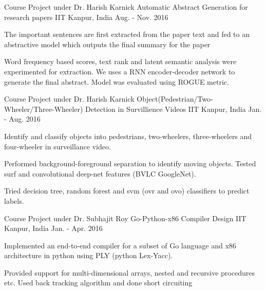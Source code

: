 \begin{cventries}
	\cventry
	{Course Project under Dr. Harish Karnick} %
	{Automatic Abstract Generation for research papers} %
	{IIT Kanpur, India} %
	{Aug. - Nov. 2016} %
	{
		\begin{cvitems} %
			\item The important sentences are first extracted from the paper text and fed to an abstractive model which outputs the final summary for the paper
			\item Word frequency based scores, text rank and latent semantic analysis were experimented for extraction. We uses a RNN encoder-decoder network to generate the final abstract. Model was evaluated using ROGUE metric.  
		\end{cvitems}
	}
	\cventry
	{Course Project under Dr. Harish Karnick} %
	{Object(Pedestrian/Two-Wheeler/Three-Wheeler) Detection in Survillience Videos} %
	{IIT Kanpur, India} %
	{Jan. - Aug. 2016} %
	{
		\begin{cvitems} %
			\item {Identify and classify objects into pedestrians, two-wheelers, three-wheelers and four-wheeler in surveillance video.}
			\item {Performed background-foreground separation to identify moving objects. Tested surf and convolutional deep-net features (BVLC GoogleNet).}
			\item {Tried decision tree, random forest and svm (ovr and ovo) classifiers to predict labels.}
		\end{cvitems}
	}
	
	
	\cventry
	{Course Project under Dr. Subhajit Roy} %
	{Go-Python-x86 Compiler Design} %
	{IIT Kanpur, India} %
	{Jan. - Apr. 2016} %
	{
		\begin{cvitems} %
			\item Implemented an end-to-end compiler for a subset of Go language and x86 architecture in python using PLY (python Lex-Yacc).
			\item Provided support for multi-dimensional arrays, nested and recursive procedures etc. Used back tracking algorithm and done short circuiting
		\end{cvitems}
	}
	

\end{cventries}
